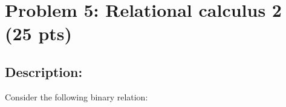 \section{Problem 5: Relational calculus 2 (25 pts)}

\subsection{Description:}

\noindent Consider the following binary relation: \\

